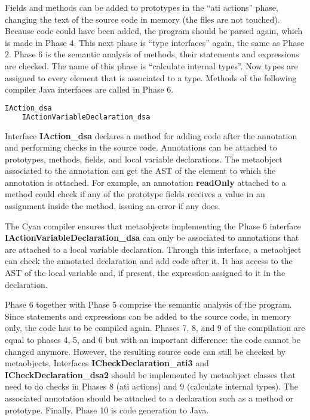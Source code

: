 \documentclass[preprint,review]{elsarticle}
\newcommand{\srcstyle}[1]{\ttfamily\textbf{#1}\rmfamily}
\begin{document}
Fields and methods  can be added to prototypes in  the ``ati actions''
phase, changing the  text of the source code in  memory (the files are
not touched). Because  code could have been added,  the program should
be parsed again, which is made in Phase 4. This next phase is ``type interfaces'' again, the same as Phase 2. Phase 6 is the semantic analysis of methods, their statements and expressions are checked. The name of this phase is ``calculate internal types''. Now types are assigned to every element that is associated to a type. Methods of the following compiler Java interfaces are called in Phase 6.
\begin{lstlisting}[language=Java]
    IAction_dsa
    IActionVariableDeclaration_dsa
\end{lstlisting}
Interface \srcstyle{IAction\_dsa}  declares a  method for  adding code
after   the   annotation  and   performing   checks   in  the   source
code. Annotations can be attached  to prototypes, methods, fields, and
local  variable   declarations.  The  metaobject  associated   to  the
annotation can get  the AST of the element to  which the annotation is
attached. For example, an annotation \srcstyle{readOnly} attached to a
method could check if any of  the prototype fields receives a value in
an assignment inside the method, issuing an error if any does.

The Cyan  compiler ensures that  metaobjects implementing the  Phase 6
interface   \srcstyle{IActionVariableDeclaration\_dsa}  can   only  be
associated to annotations that are attached to
a local  variable declaration.   Through this interface,  a metaobject
can check  the annotated declaration  and add  code after it.   It has
access  to  the  AST  of  the local  variable  and,  if  present,  the
expression assigned to it in the declaration.

Phase 6  together with Phase 5  comprise the semantic analysis  of the
program. Since statements  and expressions can be added  to the source
code, in memory only, the code has  to be compiled again. Phases 7, 8,
and 9 of the  compilation are equal to phases 4, 5, and  6 but with an
important difference:  the code  cannot be changed  anymore.  However,
the  resulting  source  code  can still  be  checked  by  metaobjects.
Interfaces            \srcstyle{ICheckDeclaration\_ati3}           and
\srcstyle{ICheckDeclaration\_dsa2} should be implemented by metaobject
classes  that need  to  do checks  in  Phases 8  (ati  actions) and  9
(calculate  internal  types).   The associated  annotation  should  be
attached  to a  declaration such  as a  method or  prototype. Finally,
Phase 10 is code generation to Java.
\end{document}
